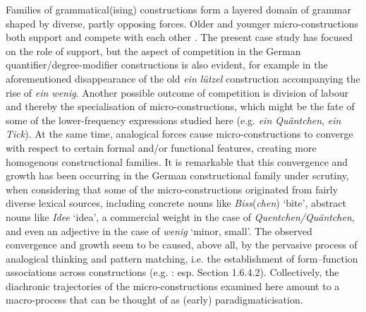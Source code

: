 \documentclass[output=paper]{langsci/langscibook}
\begin{document}
Families of grammatical(ising) constructions form a layered \citep{Hopperprinciplesgrammaticalization1991} domain of grammar shaped by diverse, partly opposing forces. Older and younger micro\hyp{}constructions both support and compete with each other \citep[cf.][]{DelorgeCompetingtransferconstructions2014, DeSmet2017, DeSmetchangingfunctionscompeting2018}. The present case study has focused on the role of support, but the aspect of competition in the German quantifier\slash degree\hyp{}modifier constructions is also evident, for example in the aforementioned disappearance of the old \textit{ein lützel} construction accompanying the rise of \textit{ein wenig}. Another possible outcome of competition is division of labour and thereby the specialisation of micro\hyp{}constructions, which might be the fate of some of the lower-frequency expressions studied here (e.g. \textit{ein Quäntchen}, \textit{ein Tick}). At the same time, analogical forces cause micro\hyp{}constructions to converge with respect to certain formal and/or functional features, creating more homogenous constructional families. It is remarkable that this convergence and growth has been occurring in the German constructional family under scrutiny, when considering that some of the micro\hyp{}constructions originated from fairly diverse lexical sources, including concrete nouns like \textit{Biss}(\textit{chen}) ‘bite’, abstract nouns like \textit{Idee} ‘idea’, a commercial weight in the case of \textit{Quentchen/Quäntchen}, and even an adjective in the case of \textit{wenig} ‘minor, small’. The observed convergence and growth seem to be caused, above all, by the pervasive process of analogical thinking and pattern matching, i.e. the establishment of form–function associations across constructions (e.g. \citealt{FischerGrammaticalizationanalogicallydriven2011, TraugottConstructionalizationConstructionalChanges2013}: esp. Section 1.6.4.2). Collectively, the diachronic trajectories of the micro\hyp{}constructions examined here amount to a macro-process that can be thought of as (early) paradigmaticisation. 
\end{document}

